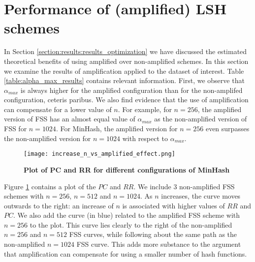 \section{Performance of (amplified) LSH schemes}
\label{section:results:amplified_vs_non_amplified}
In Section \ref{section:results:results_optimization} we have discussed the estimated theoretical benefits of using amplified over non-amplified schemes. In this section we examine the results of amplification applied to the dataset of interest. Table \ref{table:alpha_max_results} contains relevant information. First, we observe that $\alpha_{max}$ is always higher for the amplified configuration than for the non-amplifed configuration, ceteris paribus. We also find evidence that the use of amplification can compensate for a lower value of $n$. For example, for $n=256$, the amplified version of FSS has an almost equal value of $\alpha_{max}$ as the non-amplified version of FSS for $n=1024$. For MinHash, the amplified version for $n=256$ even surpasses the non-amplified version for $n=1024$ with respect to $\alpha_{max}$. %
\begin{figure}
    \centering
    \texttt{[image: increase\_n\_vs\_amplified\_effect.png]}
    \caption[Plot of PC and RR for different configurations of MinHash]{\textbf{Plot of PC and RR for different configurations of MinHash}}
    \label{fig:effect_of_n_vs_amplification}
\end{figure}
Figure \ref{fig:effect_of_n_vs_amplification} contains a plot of the $PC$ and $RR$. We include $3$ non-amplified FSS schemes with $n=256$, $n=512$ and $n=1024$. As $n$ increases, the curve moves outwards to the right: an increase of $n$ is associated with higher values of $RR$ and $PC$. We also add the curve (in blue) related to the amplified FSS scheme with $n=256$ to the plot. This curve lies clearly to the right of the non-amplified $n=256$ and $n=512$ FSS curves, while following about the same path as the non-amplified $n=1024$ FSS curve. This adds more substance to the argument that amplification can compensate for using a smaller number of hash functions. 

